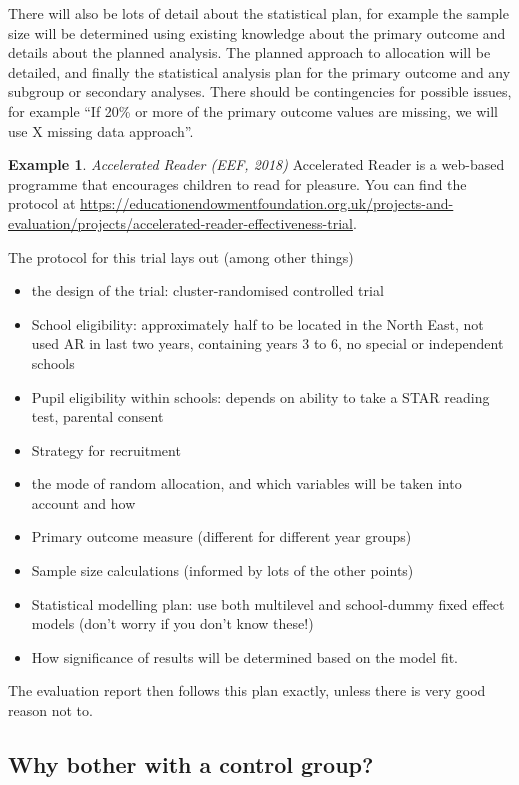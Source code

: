 \documentclass[
  openany]{book}
\providecommand{\tightlist}{%
  \setlength{\itemsep}{0pt}\setlength{\parskip}{0pt}}
\theoremstyle{definition}
\theoremstyle{definition}
\newtheorem{example}{Example}[chapter]
\theoremstyle{definition}
\theoremstyle{definition}
\theoremstyle{remark}
\begin{document}
There will also be lots of detail about the statistical plan, for example the sample size will be determined using existing knowledge about the primary outcome and details about the planned analysis. The planned approach to allocation will be detailed, and finally the statistical analysis plan for the primary outcome and any subgroup or secondary analyses. There should be contingencies for possible issues, for example ``If 20\% or more of the primary outcome values are missing, we will use X missing data approach''.

\begin{example}
\emph{Accelerated Reader (EEF, 2018)}
Accelerated Reader is a web-based programme that encourages children to read for pleasure. You can find the protocol at \url{https://educationendowmentfoundation.org.uk/projects-and-evaluation/projects/accelerated-reader-effectiveness-trial}.

The protocol for this trial lays out (among other things)

\begin{itemize}
\tightlist
\item
  the design of the trial: cluster-randomised controlled trial
\item
  School eligibility: approximately half to be located in the North East, not used AR in last two years, containing years 3 to 6, no special or independent schools
\item
  Pupil eligibility within schools: depends on ability to take a STAR reading test, parental consent
\item
  Strategy for recruitment
\item
  the mode of random allocation, and which variables will be taken into account and how
\item
  Primary outcome measure (different for different year groups)
\item
  Sample size calculations (informed by lots of the other points)
\item
  Statistical modelling plan: use both multilevel and school-dummy fixed effect models (don't worry if you don't know these!)
\item
  How significance of results will be determined based on the model fit.
\end{itemize}

The evaluation report then follows this plan exactly, unless there is very good reason not to.
\end{example}

\subsection*{Why bother with a control group?}\label{why-bother-with-a-control-group}
\end{document}
